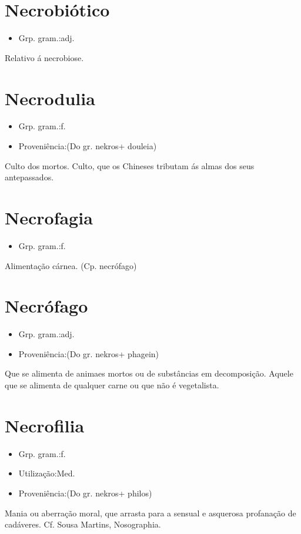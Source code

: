 \section{Necrobiótico}
\begin{itemize}
\item {Grp. gram.:adj.}
\end{itemize}
Relativo á necrobiose.
\section{Necrodulia}
\begin{itemize}
\item {Grp. gram.:f.}
\end{itemize}
\begin{itemize}
\item {Proveniência:(Do gr. \textunderscore nekros\textunderscore  + \textunderscore douleia\textunderscore )}
\end{itemize}
Culto dos mortos.
Culto, que os Chineses tributam ás almas dos seus antepassados.
\section{Necrofagia}
\begin{itemize}
\item {Grp. gram.:f.}
\end{itemize}
Alimentação cárnea.
(Cp. \textunderscore necrófago\textunderscore )
\section{Necrófago}
\begin{itemize}
\item {Grp. gram.:adj.}
\end{itemize}
\begin{itemize}
\item {Proveniência:(Do gr. \textunderscore nekros\textunderscore  + \textunderscore phagein\textunderscore )}
\end{itemize}
Que se alimenta de animaes mortos ou de substâncias em decomposição.
Aquele que se alimenta de qualquer carne ou que não é vegetalista.
\section{Necrofilia}
\begin{itemize}
\item {Grp. gram.:f.}
\end{itemize}
\begin{itemize}
\item {Utilização:Med.}
\end{itemize}
\begin{itemize}
\item {Proveniência:(Do gr. \textunderscore nekros\textunderscore  + \textunderscore philos\textunderscore )}
\end{itemize}
Mania ou aberração moral, que arrasta para a sensual e asquerosa profanação de cadáveres. Cf. Sousa Martins, \textunderscore Nosographia\textunderscore .
